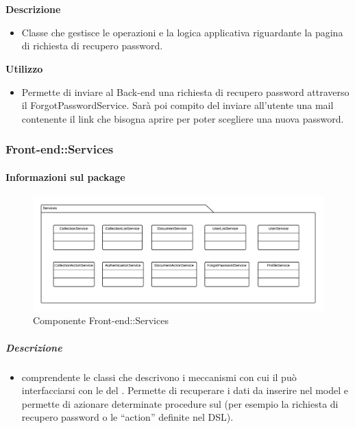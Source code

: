         \textbf{\\ \\ Descrizione} 
          \begin{itemize}
            \item[] Classe che gestisce le operazioni e la logica applicativa riguardante la pagina di richiesta di recupero password.
          \end{itemize}      
        \textbf{Utilizzo}  
          \begin{itemize}
            \item[] Permette di inviare al Back-end una richiesta di recupero password attraverso il ForgotPasswordService. Sarà poi compito del  inviare all'utente una mail contenente il link che bisogna aprire per poter scegliere una nuova password.
          \end{itemize}
  \subsubsection{Front-end::Services}
  \paragraph{Informazioni sul package}
    \begin{figure}[H] 
      \begin{center} 
        \includegraphics[width=\textwidth]{packages/Front-end::Services.png}  
        \caption{Componente Front-end::Services}
      \end{center}  
    \end{figure} 
  \subparagraph{Descrizione} 
    \begin{itemize}
    \item[]  comprendente le classi che descrivono i meccanismi con cui il  può interfacciarsi con le  del . Permette di recuperare i dati da inserire nel model e permette di azionare determinate procedure sul  (per esempio la richiesta di recupero password o le ``action'' definite nel DSL).
    \end{itemize} 
